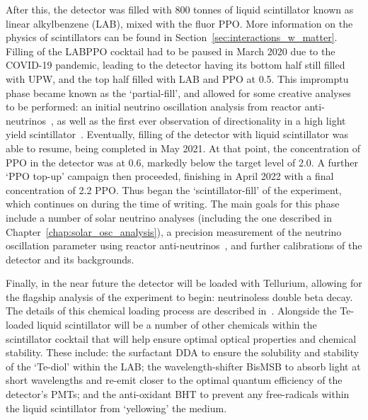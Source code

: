 After this, the detector was filled with 800 tonnes of liquid scintillator known as linear alkylbenzene (LAB), mixed with the fluor PPO. More information on the physics of scintillators can be found in Section~\ref{sec:interactions_w_matter}. Filling of the LABPPO cocktail had to be paused in March 2020 due to the COVID-19 pandemic, leading to the detector having its bottom half still filled with UPW, and the top half filled with LAB and PPO at \SI{0.5}{\gpl}. This impromptu phase became known as the `partial-fill', and allowed for some creative analyses to be performed: an initial neutrino oscillation analysis from reactor anti-neutrinos~\cite{}, %
as well as the first ever observation of directionality in a high light yield scintillator~\cite{}. %
Eventually, filling of the detector with liquid scintillator was able to resume, being completed in May 2021. At that point, the concentration of PPO in the detector was at \SI{0.6}{\gpl}, markedly below the target level of \SI{2.0}{\gpl}. A further `PPO top-up' campaign then proceeded, finishing in April 2022 with a final concentration of \SI{2.2}{\gpl} PPO. Thus began the `scintillator-fill' of the experiment, which continues on during the time of writing. The main goals for this phase include a number of solar neutrino analyses (including the one described in Chapter~\ref{chap:solar_osc_analysis}), a precision measurement of the neutrino oscillation parameter \dmsq{} using reactor anti-neutrinos~\cite{}, %
and further calibrations of the detector and its backgrounds.

Finally, in the near future the detector will be loaded with Tellurium, allowing for the flagship analysis of the experiment to begin: neutrinoless double beta decay. The details of this chemical loading process are described in~\cite{}. %
Alongside the Te-loaded liquid scintillator will be a number of other chemicals within the scintillator cocktail that will help ensure optimal optical properties and chemical stability. These include: the surfactant DDA to ensure the solubility and stability of the `Te-diol' within the LAB; the wavelength-shifter BisMSB to absorb light at short wavelengths and re-emit closer to the optimal quantum efficiency of the detector's PMTs; and the anti-oxidant BHT to prevent any free-radicals within the liquid scintillator from `yellowing' the medium.

